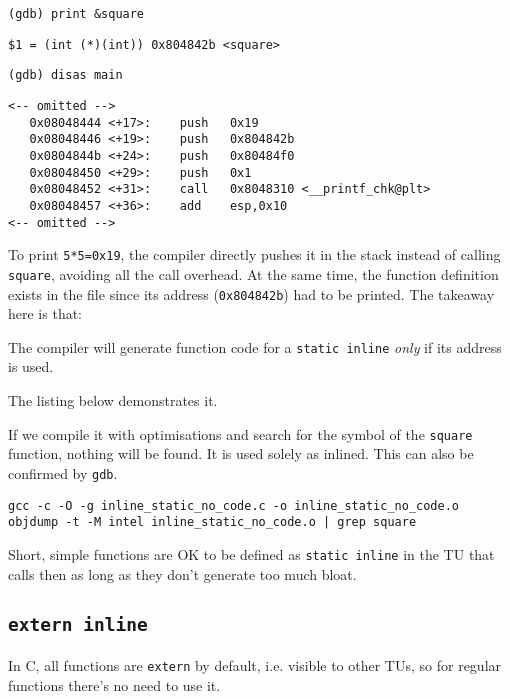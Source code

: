 \documentclass[a4paper]{article}
\begin{document}
\begin{lstlisting}[style=terminal]
(gdb) print &square
\end{lstlisting}
\begin{verbatim}
$1 = (int (*)(int)) 0x804842b <square>
\end{verbatim}
\begin{lstlisting}[style=terminal]
(gdb) disas main
\end{lstlisting}
\begin{verbatim}
<-- omitted -->
   0x08048444 <+17>:	push   0x19
   0x08048446 <+19>:	push   0x804842b
   0x0804844b <+24>:	push   0x80484f0
   0x08048450 <+29>:	push   0x1
   0x08048452 <+31>:	call   0x8048310 <__printf_chk@plt>
   0x08048457 <+36>:	add    esp,0x10
<-- omitted -->
\end{verbatim}
To print \texttt{5*5=0x19}, the compiler directly pushes it in the stack instead of calling \texttt{square}, avoiding all the call overhead. At the same time, the function definition exists in the file since its address (\texttt{0x804842b}) had to be printed. The takeaway here is that:
\begin{takeaway}
The compiler will generate function code for a \texttt{static inline} \textit{only} if its address is used.
\end{takeaway}
The listing below demonstrates it.

If we compile it with optimisations and search for the symbol of the \texttt{square} function, nothing will be found. It is used solely as inlined. This can also be confirmed by \texttt{gdb}.
\begin{lstlisting}[style=terminal]
gcc -c -O -g inline_static_no_code.c -o inline_static_no_code.o
objdump -t -M intel inline_static_no_code.o | grep square
\end{lstlisting}
\begin{takeaway}
Short, simple functions are OK to be defined as \texttt{static inline} in the TU that calls then as long as they don't generate too much bloat.
\end{takeaway}


\subsection{\texttt{extern inline}}

In C, all functions are \texttt{extern} by default, i.e. visible to other TUs, so for regular functions there's no need to use it. 
\end{document}
